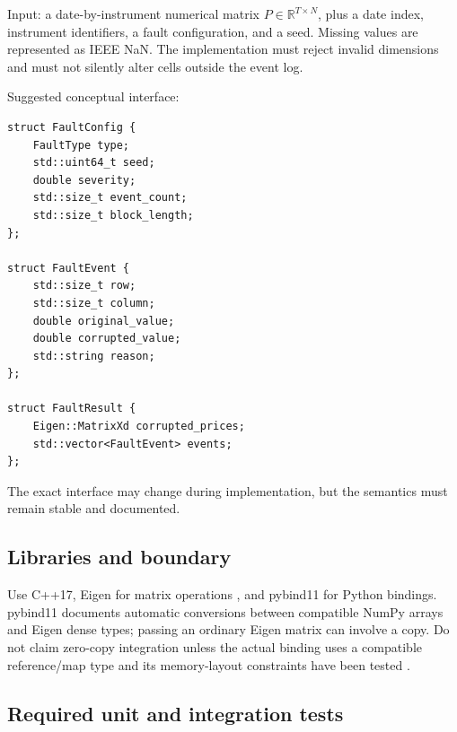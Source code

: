 \documentclass[11pt,a4paper]{article}
\begin{document}
Input: a date-by-instrument numerical matrix $P\in\mathbb{R}^{T\times N}$, plus a date index, instrument identifiers, a fault configuration, and a seed. Missing values are represented as IEEE NaN. The implementation must reject invalid dimensions and must not silently alter cells outside the event log.

Suggested conceptual interface:
\begin{lstlisting}[style=cpp]
struct FaultConfig {
    FaultType type;
    std::uint64_t seed;
    double severity;
    std::size_t event_count;
    std::size_t block_length;
};

struct FaultEvent {
    std::size_t row;
    std::size_t column;
    double original_value;
    double corrupted_value;
    std::string reason;
};

struct FaultResult {
    Eigen::MatrixXd corrupted_prices;
    std::vector<FaultEvent> events;
};
\end{lstlisting}

The exact interface may change during implementation, but the semantics must remain stable and documented.

\subsection{Libraries and boundary}

Use C++17, Eigen for matrix operations \cite{Eigen}, and pybind11 for Python bindings. pybind11 documents automatic conversions between compatible NumPy arrays and Eigen dense types; passing an ordinary Eigen matrix can involve a copy. Do not claim zero-copy integration unless the actual binding uses a compatible reference/map type and its memory-layout constraints have been tested \cite{PybindEigen}.

\subsection{Required unit and integration tests}
\end{document}
